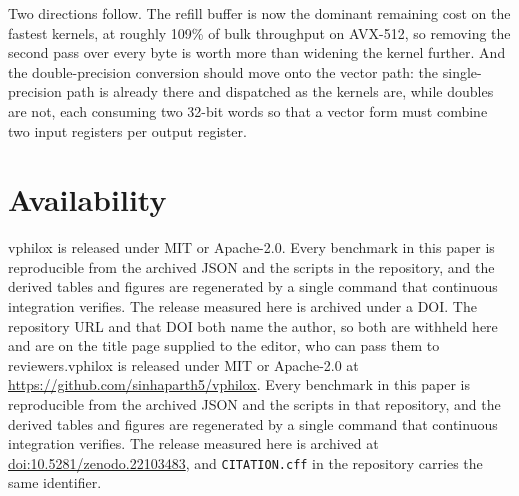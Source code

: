 \documentclass[acmsmall,screen,review]{acmart}
\makeatletter
\theoremstyle{acmdefinition}
\newcommand{\code}[1]{\texttt{#1}}
\newcommand{\ifanon}[2]{\if@ACM@anonymous#1\else#2\fi}
\makeatother
\begin{document}
Two directions follow. The refill buffer is now the dominant remaining cost on
the fastest kernels, at roughly 109\% of bulk throughput on AVX-512, so removing
the second pass over every byte is worth more than widening the kernel further.
And the double-precision conversion should move onto the vector path: the
single-precision path is already there and dispatched as the kernels are, while
doubles are not, each consuming two 32-bit words so that a vector form must
combine two input registers per output register.

\section*{Availability}

\ifanon{vphilox is released under MIT or Apache-2.0. Every benchmark in this
paper is reproducible from the archived JSON and the scripts in the repository,
and the derived tables and figures are regenerated by a single command that
continuous integration verifies. The release measured here is archived under a
DOI. The repository URL and that DOI both name the author, so both are withheld
here and are on the title page supplied to the editor, who can pass them to
reviewers.}{vphilox is released under MIT or Apache-2.0 at
\url{https://github.com/sinhaparth5/vphilox}. Every benchmark in this paper is
reproducible from the archived JSON and the scripts in that repository, and the
derived tables and figures are regenerated by a single command that continuous
integration verifies. The release measured here is archived at
\href{https://doi.org/10.5281/zenodo.22103483}{doi:10.5281/zenodo.22103483},
and \code{CITATION.cff} in the repository carries the same identifier.}



\end{document}
